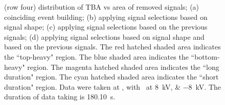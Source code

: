 \begin{landscape}
\begin{figure}[!p]
{			(row four) distribution of TBA vs area of removed signals;
			(a) coinciding event building; 
			(b) applying signal selections based on signal shape;
			(c) applying signal selections based on the previous signals;
			(d) applying signal selections based on signal shape and based on the previous signals.
			The red hatched shaded area indicates the ``top-heavy" region.
			The blue shaded area indicates the ``bottom-heavy" region.
			The magenta hatched shaded area indicates the ``long duration" region.
			The cyan hatched shaded area indicates the ``short duration" region.
			Data were taken at , with \opvtvb\ at \SIlist{+8;-8}{kV}. The duration of data taking is \SI{180.10}{\s}.
		}
		\label{fig:signal selection dv 16}
	\end{figure}
\end{landscape}


